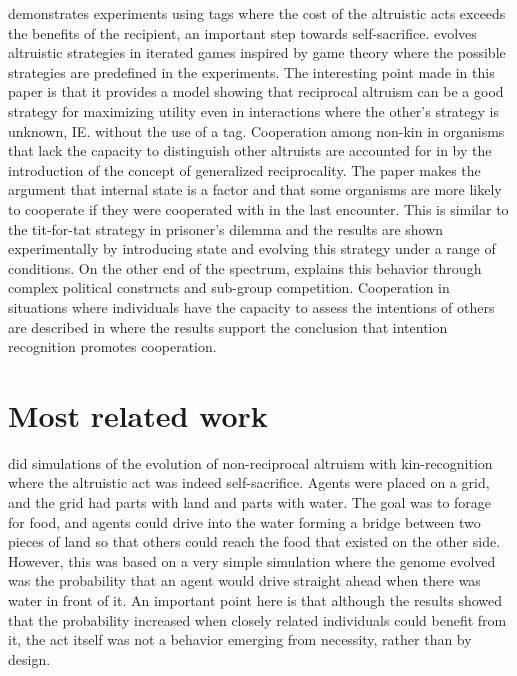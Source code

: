 \documentclass[a4paper]{book}
\begin{document}
\cite{spector_genetic_2006} demonstrates experiments using tags where the cost of the altruistic acts exceeds the benefits of the recipient, an important step towards self-sacrifice.
\cite{mayoh_evolution_2000-1} evolves altruistic strategies in iterated games inspired by game theory where the possible strategies are predefined in the experiments. The interesting point made in this paper is that it provides a model showing that reciprocal altruism can be a good strategy for maximizing utility even in interactions where the other's strategy is unknown, IE. without the use of a tag. 
Cooperation among non-kin in organisms that lack the capacity to distinguish other altruists are accounted for in \cite{barta_cooperation_2010} by the introduction of the concept of generalized reciprocality. The paper makes the argument that internal state is a factor and that some organisms are more likely to cooperate if they were cooperated with in the last encounter. This is similar to the tit-for-tat strategy in prisoner's dilemma and the results are shown experimentally by introducing state and evolving this strategy under a range of conditions.
On the other end of the spectrum, \cite{dessalles_coalition_1999} explains this behavior through complex political constructs and sub-group competition. Cooperation in situations where individuals have the capacity to assess the intentions of others are described in \cite{han_role_2011} where the results support the conclusion that intention recognition promotes cooperation.


\section{Most related work}

\cite{martijn_brinkers_evolution_1999} did simulations of the evolution of non-reciprocal altruism with kin-recognition where the altruistic act was indeed self-sacrifice. Agents were placed on a grid, and the grid had parts with land and parts with water. The goal was to forage for food, and agents could drive into the water forming a bridge between two pieces of land so that others could reach the food that existed on the other side. However, this was based on a very simple simulation where the genome evolved was the probability that an agent would drive straight ahead when there was water in front of it. An important point here is that although the results showed that the probability increased when closely related individuals could benefit from it, the act itself was not a behavior emerging from necessity, rather than by design. 
\end{document}
